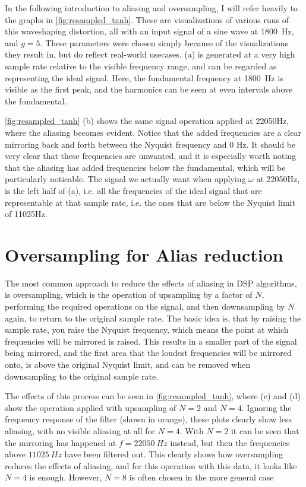 In the following introduction to aliasing and oversampling, I will refer heavily to the graphs in
\autoref{fig:resampled_tanh}. These are visualizations of various runs of this waveshaping distortion, all with an
input signal of a sine wave at \SI{1800}{Hz}, and $g = 5$. These parameters were
chosen simply because of the visualizations they result in, but do reflect real-world usecases. (a) is
generated at a very high sample rate relative to the visible frequency range, and can be regarded as
representing the ideal signal. Here, the fundamental frequency at \SI{1800}{Hz} is visible as the
first peak, and the harmonics can be seen at even intervals above the fundamental.

\autoref{fig:resampled_tanh} (b) shows the same signal operation applied at 22050Hz, where the aliasing becomes
evident. Notice that the added frequencies are a clear mirroring back and forth between the Nyquist frequency
and 0 Hz. It should be very clear that these frequencies are unwanted, and it is especially worth noting that
the aliasing has added frequencies below the fundamental, which will be particularly noticable. The signal we
actually want when applying $\omega$ at 22050Hz, is the left half of (a), i.e. all the
frequencies of the ideal signal that are representable at that sample rate, i.e. the ones that are below the
Nyquist limit of 11025Hz.

\section{Oversampling for Alias reduction}
The most common approach to reduce the effects of aliasing in DSP algorithms, is oversampling, which is the
operation of upsampling by a factor of $N$, performing the required operations on the
signal, and then downsampling by $N$ again, to return to the original sample rate. The
basic idea is, that by raising the sample rate, you raise the Nyquist frequency, which means the point at
which frequencies will be mirrored is raised. This results in a smaller part of the signal being mirrored,
and the first area that the loudest frequencies will be mirrored onto, is above the original Nyquist limit,
and can be removed when downsampling to the original sample rate.

The effects of this process can be seen in \autoref{fig:resampled_tanh}, where (c) and (d) show the operation
applied with upsampling of $N = 2$ and $N = 4$. Ignoring the frequency response
of the filter (shown in orange), these plots clearly show less aliasing, with no visible aliasing at all for
$N = 4$. With $N = 2$ it can be seen that the mirroring has happened at
$f = \SI{22050}{Hz}$ instead, but then the frequencies above $\SI{11025}{Hz}$ have been filtered out.
This clearly shows how oversampling reduces the effects of aliasing, and for this operation with this data,
it looks like $N = 4$ is enough. However, $N = 8$ is often chosen in the more
general case \autocite{kahles2019oversampling}

